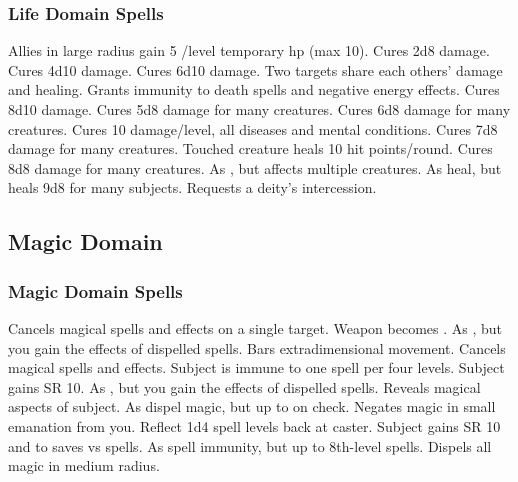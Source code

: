 \subsubsection{Life Domain Spells}
\begin{spelllist}
   Allies in large radius gain 5 /level temporary hp (max 10).
   Cures 2d8 damage.
  \spellhead[2]{}
   Cures 4d10 damage.
   Cures 6d10 damage.
   Two targets share each others' damage and healing.
   Grants immunity to death spells and negative energy effects.
   Cures 8d10 damage.
   Cures 5d8 damage for many creatures.
  \spellhead[5]{}
   Cures 6d8 damage for many creatures.
   Cures 10 damage/level, all diseases and mental conditions.  
   Cures 7d8 damage for many creatures.
   Touched creature heals 10 hit points/round.
   Cures 8d8 damage for many creatures.
   As , but affects multiple creatures.
   As heal, but heals 9d8 for many subjects.
   Requests a deity's intercession.
\end{spelllist}

\subsection{Magic Domain}

\subsubsection{Magic Domain Spells}
\begin{spelllist}
   Cancels magical spells and effects on a single target.
   Weapon becomes .
   As , but you gain the effects of dispelled spells.
   Bars extradimensional movement.
   Cancels magical spells and effects.
   Subject is immune to one spell per four levels.
   Subject gains SR 10.
   As , but you gain the effects of dispelled spells.
  \F Reveals magical aspects of subject.
   As dispel magic, but up to  on check.
   Negates magic in small emanation from you.
   Reflect 1d4 spell levels back at caster.
   Subject gains SR 10 and  to saves vs spells.
   As spell immunity, but up to 8th-level spells.
   Dispels all magic in medium radius.
  \spellhead[9]{}
\end{spelllist}
